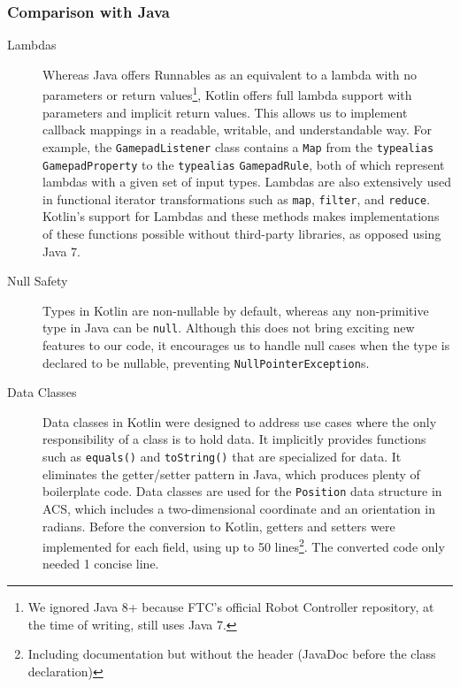 \documentclass[letterpaper]{article}
\begin{document}
\subsubsection{Comparison with Java}
\begin{description}

\item[Lambdas]
Whereas Java offers Runnables as an equivalent to a lambda with no parameters or return values\footnote{We ignored Java 8+ because FTC's official Robot Controller repository, at the time of writing, still uses Java 7.}, Kotlin offers full lambda support with parameters and implicit return values. This allows us to implement callback mappings in a readable, writable, and understandable way. For example, the \texttt{GamepadListener} class contains a \texttt{Map} from the \texttt{typealias} \texttt{GamepadProperty} to the \texttt{typealias} \texttt{GamepadRule}, both of which represent lambdas with a given set of input types. Lambdas are also extensively used in functional iterator transformations such as \texttt{map}, \texttt{filter}, and \texttt{reduce}. Kotlin's support for Lambdas and these methods makes implementations of these functions possible without third-party libraries, as opposed using Java 7.

\item[Null Safety]
Types in Kotlin are non-nullable by default, whereas any non-primitive type in Java can be \texttt{null}. Although this does not bring exciting new features to our code, it encourages us to handle null cases when the type is declared to be nullable, preventing \texttt{NullPointerException}s.

\item[Data Classes]
Data classes in Kotlin were designed to address use cases where the only responsibility of a class is to hold data. It implicitly provides functions such as \texttt{equals()} and \texttt{toString()} that are specialized for data. It eliminates the getter/setter pattern in Java, which produces plenty of boilerplate code. Data classes are used for the \texttt{Position} data structure in ACS, which includes a two-dimensional coordinate and an orientation in radians. Before the conversion to Kotlin, getters and setters were implemented for each field, using up to 50 lines\footnote{Including documentation but without the header (JavaDoc before the class declaration)}. The converted code only needed 1 concise line.

\end{description}
\end{document}
